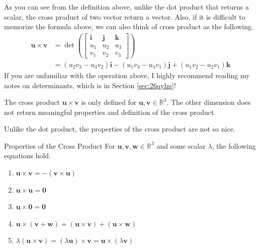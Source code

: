 \documentclass[../../../main.tex]{subfiles}
\begin{document}
As you can see from the definition above, unlike the dot product
that returns a scalar, the cross product of two vector return
a vector. Also, if it is difficult to memorize the formula above,
we can also think of cross product as the following.
\begin{align*}
    \mathbf{u} \times \mathbf{v}
    &= \det\left(
        \begin{bmatrix}
            \mathbf{i} & \mathbf{j} & \mathbf{k} \\
            u_1        & u_2        & u_3        \\
            v_1        & v_2        & v_3
        \end{bmatrix}
    \right) \\
    &= (u_2v_3 - u_3v_2) \mathbf{i} - (u_1v_3 - u_3v_1) \mathbf{j}
        + (u_1v_2 - u_2v_1) \mathbf{k}
\end{align*}
If you are unfamiliar with the operation above, I highly recommend
reading my notes on determinants, which is in Section
\ref{sec:26qylzs}!

\begin{important}
The cross product $\mathbf{u} \times \mathbf{v}$ is only defined for
$\mathbf{u}, \mathbf{v} \in \mathbb{R}^3$. The other dimension does
not return meaningful properties and definition of the cross product.
\end{important}

Unlike the dot product, the properties of the cross product are
not so nice.

\begin{theorem}{}{Properties of the Cross Product}
For $\mathbf{u}, \mathbf{v}, \mathbf{w} \in \mathbb{R}^3$ and some
scalar $\lambda$, the following equations hold.
\vspace{-0.8\baselineskip}
\begin{enumerate}
\item
$\mathbf{u} \times \mathbf{v} = - (\mathbf{v} \times \mathbf{u})$
\item
$\mathbf{u} \times \mathbf{u} = \mathbf{0}$
\item
$\mathbf{u} \times \mathbf{0} = \mathbf{0}$
\item
$\mathbf{u} \times (\mathbf{v} + \mathbf{w})
= (\mathbf{u} \times \mathbf{v}) + (\mathbf{u} \times \mathbf{w})$
\item
$\lambda (\mathbf{u} \times \mathbf{v})
= (\lambda \mathbf{u}) \times \mathbf{v}
= \mathbf{u} \times (\lambda \mathbf{v})$
\end{enumerate}
\end{theorem}
\end{document}
